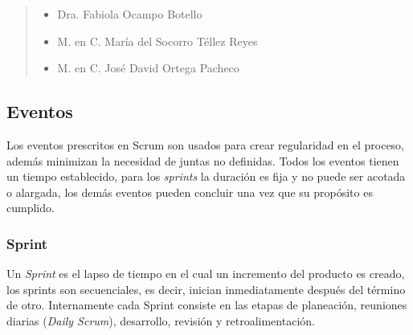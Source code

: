     \begin{quote}
    \begin{itemize}
        \item Dra. Fabiola Ocampo Botello
        \item M. en C. María del Socorro Téllez Reyes
        \item M. en C. José David Ortega Pacheco
    \end{itemize}
    \end{quote}

\subsection{Eventos}

 Los eventos prescritos en Scrum son usados para crear regularidad en el proceso, además
 minimizan la necesidad de juntas no definidas. Todos los eventos tienen un tiempo establecido, 
 para los {\it sprints} la duración es fija y no puede ser acotada o alargada, los demás eventos
 pueden concluir una vez que su propósito es cumplido.

\subsubsection{Sprint}

 Un {\it Sprint} es el lapso de tiempo en el cual un incremento del producto es creado, los sprints
 son secuenciales, es decir, inician inmediatamente después del término de otro. Internamente 
 cada Sprint consiste en las etapas de planeación, reuniones diarias ({\it Daily Scrum}),
 desarrollo, revisión y retroalimentación.
    
    

